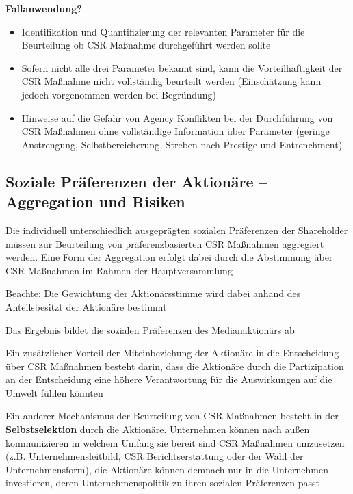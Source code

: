 \documentclass[
]{article}
\providecommand{\tightlist}{%
  \setlength{\itemsep}{0pt}\setlength{\parskip}{0pt}}
\begin{document}
\textbf{Fallanwendung?}

\begin{itemize}
\tightlist
\item
  Identifikation und Quantifizierung der relevanten Parameter für die
  Beurteilung ob CSR Maßnahme durchgeführt werden sollte
\item
  Sofern nicht alle drei Parameter bekannt sind, kann die
  Vorteilhaftigkeit der CSR Maßnahme nicht vollständig beurteilt werden
  (Einschätzung kann jedoch vorgenommen werden bei Begründung)
\item
  Hinweise auf die Gefahr von Agency Konflikten bei der Durchführung von
  CSR Maßnahmen ohne vollständige Information über Parameter (geringe
  Anstrengung, Selbstbereicherung, Streben nach Prestige und
  Entrenchment)
\end{itemize}

\hypertarget{soziale-pruxe4ferenzen-der-aktionuxe4re-aggregation-und-risiken}{%
\subsection{Soziale Präferenzen der Aktionäre -- Aggregation und
Risiken}\label{soziale-pruxe4ferenzen-der-aktionuxe4re-aggregation-und-risiken}}

Die individuell unterschiedlich ausgeprägten sozialen Präferenzen der
Shareholder müssen zur Beurteilung von präferenzbasierten CSR Maßnahmen
aggregiert werden. Eine Form der Aggregation erfolgt dabei durch die
Abstimmung über CSR Maßnahmen im Rahmen der Hauptversammlung

Beachte: Die Gewichtung der Aktionärsstimme wird dabei anhand des
Anteilsbesitzt der Aktionäre bestimmt

Das Ergebnis bildet die sozialen Präferenzen des Medianaktionärs ab

Ein zusätzlicher Vorteil der Miteinbeziehung der Aktionäre in die
Entscheidung über CSR Maßnahmen besteht darin, dass die Aktionäre durch
die Partizipation an der Entscheidung eine höhere Verantwortung für die
Auswirkungen auf die Umwelt fühlen könnten

Ein anderer Mechanismus der Beurteilung von CSR Maßnahmen besteht in der
\textbf{Selbstselektion} durch die Aktionäre. Unternehmen können nach
außen kommunizieren in welchem Umfang sie bereit sind CSR Maßnahmen
umzusetzen (z.B. Unternehmensleitbild, CSR Berichtserstattung oder der
Wahl der Unternehmensform), die Aktionäre können demnach nur in die
Unternehmen investieren, deren Unternehmenspolitik zu ihren sozialen
Präferenzen passt
\end{document}

